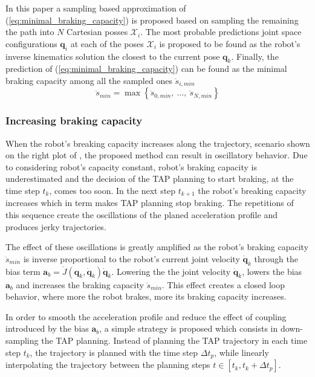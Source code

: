 In this paper a sampling based approximation of (\ref{eq:minimal_braking_capacity}) is proposed based on sampling the remaining the path into $N$ Cartesian posses $\mathcal{X}_i$. The most probable predictions joint space configurations $\bm{q}_i$ at each of the poses $\mathcal{X}_i$ is proposed to be found as the robot's inverse kinematics solution the closest to the current pose $\bm{q}_k$. Finally, the prediction of (\ref{eq:minimal_braking_capacity}) can be found as the minimal braking capacity among all the sampled ones $\ddot{s}_{i, min}$
\begin{equation}
    \ddot{s}_{min} = \max \left\{\ddot{s}_{0, min},~ \ldots,~ \ddot{s}_{N, min}\right \}
\end{equation}


\subsubsection{Increasing braking capacity}
When the robot's breaking capacity increases along the trajectory, scenario shown on the right plot of , the proposed method can result in oscillatory behavior.  Due to considering robot's capacity constant, robot's braking capacity is underestimated and the decision of the TAP planning to start braking, at the time step $t_k$, comes too soon. In the next step $t_{k+1}$ the robot's breaking capacity increases which in term makes TAP planning stop braking. The repetitions of this sequence create the oscillations of the planed acceleration profile and produces jerky trajectories. 

The effect of these oscillations is greatly amplified as the robot's braking capacity $\ddot{s}_{min}$ is inverse proportional to the robot's current joint velocity $\dot{\bm{q}}_{k}$ through the bias term $\bm{a}_b = \dot{J}(\bm{q}_k,\dot{\bm{q}}_k)\dot{\bm{q}}_k$. Lowering the the joint velocity $\dot{\bm{q}}_{k}$, lowers the bias $\bm{a}_b$ and increases the braking capacity $\ddot{s}_{min}$. This effect creates a closed loop behavior, where more the robot brakes, more its braking capacity increases. 

In order to smooth the acceleration profile and reduce the effect of coupling introduced by the bias $\bm{a}_b$, a simple strategy is proposed which consists in down-sampling the TAP planning. Instead of planning the TAP trajectory in each time step $t_k$, the trajectory is planned with the time step $\Delta t_p$, while linearly interpolating the trajectory between the planning steps $t \in \left[t_k, t_k+\Delta t_p\right]$. 

